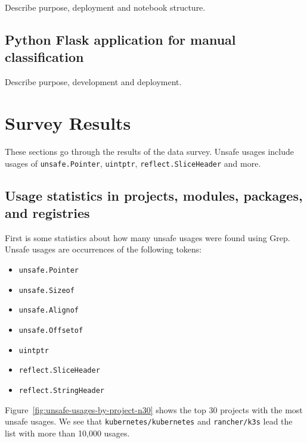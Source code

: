 Describe purpose, deployment and notebook structure.



\subsection{Python Flask application for manual classification}\label{subsec:survey-classification}

Describe purpose, development and deployment.



\section{Survey Results}\label{sec:survey-results}

These sections go through the results of the data survey.
Unsafe usages include usages of \texttt{unsafe.Pointer}, \texttt{uintptr}, \texttt{reflect.SliceHeader} and more.



\subsection{Usage statistics in projects, modules, packages, and registries}\label{subsec:results-stats}

First is some statistics about how many unsafe usages were found using Grep.
Unsafe usages are occurrences of the following tokens:

\begin{itemize}
    \item \texttt{unsafe.Pointer}
    \item \texttt{unsafe.Sizeof}
    \item \texttt{unsafe.Alignof}
    \item \texttt{unsafe.Offsetof}
    \item \texttt{uintptr}
    \item \texttt{reflect.SliceHeader}
    \item \texttt{reflect.StringHeader}
\end{itemize}

Figure~\ref{fig:unsafe-usages-by-project-n30} shows the top 30 projects with the most unsafe usages.
We see that \texttt{kubernetes/kubernetes} and \texttt{rancher/k3s} lead the list with more than 10,000 usages.

